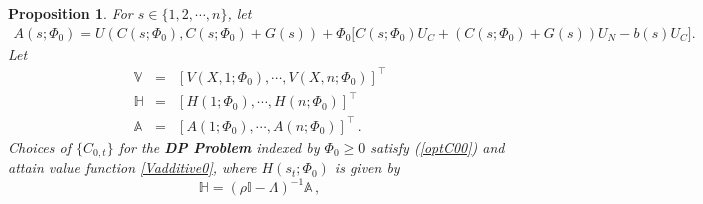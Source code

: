 \documentclass[12pt]{article}
\newtheorem{proposition}{Proposition}
\newcommand{\NW}[1]{{\textcolor{blue}{#1}}}
\begin{document}
\begin{proposition} \label{proH}
For  $s\in\{1, 2, \cdots, n\}$, let
	\begin{align*}
		{A}(s; \Phi_0)  =   U(C(s; \Phi_0),C(s; \Phi_0)+G(s)) 
	+ \Phi_0 \big[C(s; \Phi_0) U_{C}+(C(s; \Phi_0)+G(s)) U_{N}-b(s) U_{C} \big] 
	. \end{align*}  
Let \begin{eqnarray*}
	\mathbb{V} &= & \left[V(X, 1; \Phi_0), \cdots, V(X, n; \Phi_0)  \right]^{\intercal} \\
	\mathbb{H}  & = &  \left[{H}(1; \Phi_0), \cdots, {H}(n; \Phi_0)\right]^{\intercal}  \\
	\mathbb{A}  & =   & \left[{A}(1; \Phi_0), \cdots, {A}(n; \Phi_0)\right]^{\intercal}  \,.
\end{eqnarray*}
	Choices of $\{C_{0,t}\}$  for the  {\bf  DP Problem} indexed by  $\Phi_0\geq 0$ satisfy  (\ref{optC00})  and attain  value function \eqref{Vadditive0},
	where $H(s_t; \Phi_0)$ is given by
	\begin{equation}\label{HH}
		\mathbb{H} = \left(\rho \mathbb{I}-{\Lambda}  \right)^{-1}\mathbb{A} \, , 
	\end{equation}
	 $
	$
	
\end{proposition}
\end{document}
